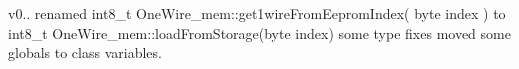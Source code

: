 v0.. renamed int8\+\_\+t One\+Wire\+\_\+mem\+::get1wire\+From\+Eeprom\+Index( byte index ) to int8\+\_\+t One\+Wire\+\_\+mem\+::load\+From\+Storage(byte index) some type fixes moved some globals to class variables. 